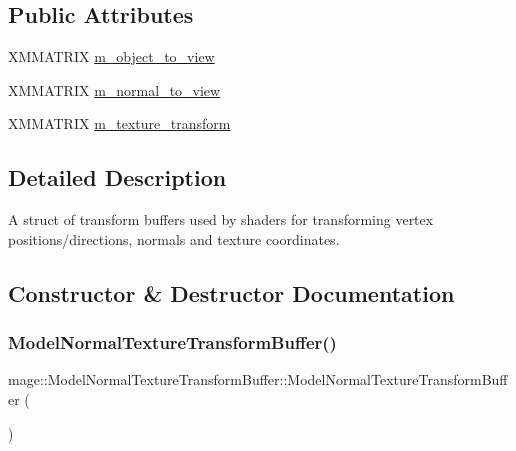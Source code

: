 \subsection*{Public Attributes}
\begin{DoxyCompactItemize}
\item 
X\+M\+M\+A\+T\+R\+IX \hyperlink{structmage_1_1_model_normal_texture_transform_buffer_ad7529c313b070994419a129476db4308}{m\+\_\+object\+\_\+to\+\_\+view}
\item 
X\+M\+M\+A\+T\+R\+IX \hyperlink{structmage_1_1_model_normal_texture_transform_buffer_a2e8950b98f36bd1ad6d5b35a8db298a9}{m\+\_\+normal\+\_\+to\+\_\+view}
\item 
X\+M\+M\+A\+T\+R\+IX \hyperlink{structmage_1_1_model_normal_texture_transform_buffer_a702a55ad742e74f29c57582dd2686864}{m\+\_\+texture\+\_\+transform}
\end{DoxyCompactItemize}


\subsection{Detailed Description}
A struct of transform buffers used by shaders for transforming vertex positions/directions, normals and texture coordinates. 

\subsection{Constructor \& Destructor Documentation}
\hypertarget{structmage_1_1_model_normal_texture_transform_buffer_a0c5eafca7db1fd43752484090ebcf4ab}{}\label{structmage_1_1_model_normal_texture_transform_buffer_a0c5eafca7db1fd43752484090ebcf4ab} 
\subsubsection{\texorpdfstring{Model\+Normal\+Texture\+Transform\+Buffer()}{ModelNormalTextureTransformBuffer()}\hspace{0.1cm}{\footnotesize\ttfamily [1/3]}}
{\footnotesize\ttfamily mage\+::\+Model\+Normal\+Texture\+Transform\+Buffer\+::\+Model\+Normal\+Texture\+Transform\+Buffer (\begin{DoxyParamCaption}{ }\end{DoxyParamCaption})\hspace{0.3cm}{\ttfamily [noexcept]}}

